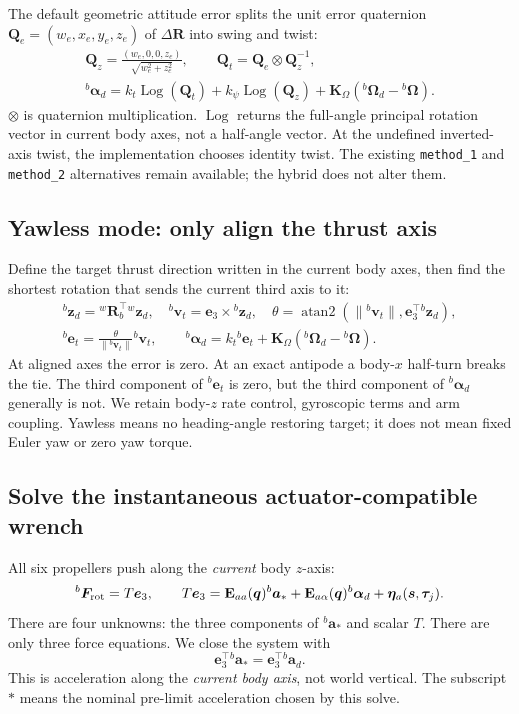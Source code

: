 \documentclass[11pt,a4paper]{article}
\newcommand{\vct}[1]{\boldsymbol{#1}}
\newcommand{\mat}[1]{\mathbf{#1}}
\newcommand{\bv}[1]{{}^{b}\vct{#1}}
\newcommand{\wv}[1]{{}^{w}\vct{#1}}
\newcommand{\Rw}{{}^{w}\mat R_b}
\newcommand{\e}{\vct e_3}
\begin{document}
The default geometric attitude error splits the unit error quaternion
$\vct Q_e=(w_e,x_e,y_e,z_e)$ of $\Delta\mat R$ into swing and twist:
\begin{equation}
\begin{gathered}
\vct Q_z=\frac{(w_e,0,0,z_e)}{\sqrt{w_e^2+z_e^2}},\qquad
\vct Q_t=\vct Q_e\otimes\vct Q_z^{-1},\\
\bv\alpha_d=k_t\operatorname{Log}(\vct Q_t)
+k_\psi\operatorname{Log}(\vct Q_z)
+\mat K_\Omega(\bv\Omega_d-\bv\Omega).
\end{gathered}\label{eq:headedalpha}
\end{equation}
$\otimes$ is quaternion multiplication. $\operatorname{Log}$ returns the full-angle
principal rotation vector in current body axes, not a half-angle vector. At the
undefined inverted-axis twist, the implementation chooses identity twist.
The existing \texttt{method\_1} and \texttt{method\_2} alternatives remain available;
the hybrid does not alter them.

\subsection{Yawless mode: only align the thrust axis}
Define the target thrust direction written in the current body axes, then find
the shortest rotation that sends the current third axis to it:
\begin{equation}
\begin{gathered}
\bv z_d=\Rw^\top\wv z_d,\quad
\bv v_t=\e\times\bv z_d,\quad
\theta=\operatorname{atan2}(\|\bv v_t\|,\e^\top\bv z_d),\\
\bv e_t=\frac{\theta}{\|\bv v_t\|}\bv v_t,\qquad
\bv\alpha_d=k_t\bv e_t+\mat K_\Omega(\bv\Omega_d-\bv\Omega).
\end{gathered}\label{eq:yawlessalpha}
\end{equation}
At aligned axes the error is zero. At an exact antipode a body-$x$ half-turn
breaks the tie. The third component of $\bv e_t$ is zero, but the third component
of $\bv\alpha_d$ generally is not. We retain body-$z$ rate control, gyroscopic
terms and arm coupling. Yawless means no heading-angle restoring target; it does
not mean fixed Euler yaw or zero yaw torque.

\subsection{Solve the instantaneous actuator-compatible wrench}
All six propellers push along the \emph{current} body $z$-axis:
\begin{equation}
\bv F_{\rm rot}=T\e,\qquad
T\e=\mat E_{aa}(\vct q)\bv a_*
+\mat E_{a\alpha}(\vct q)\bv\alpha_d
+\vct\eta_a(\vct s,\vct\tau_j).
\label{eq:thrustaxis}
\end{equation}
There are four unknowns: the three components of $\bv a_*$ and scalar $T$.
There are only three force equations. We close the system with
\begin{equation}
\e^\top\bv a_*=\e^\top\bv a_d.
\label{eq:closure}
\end{equation}
This is acceleration along the \emph{current body axis}, not world vertical.
The subscript $*$ means the nominal pre-limit acceleration chosen by this solve.
\end{document}
